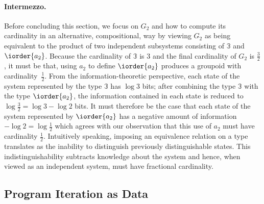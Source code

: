 \paragraph{Intermezzo.} Before concluding this section, we focus on
$G_2$ and how to compute its cardinality in an alternative,
compositional, way by viewing $G_2$ as being equivalent to the product
of two independent subsystems consisting of $\mathbb{3}$ and
$\iorder{a_2}$. Because the cardinality of $\mathbb{3}$ is 3 and the
final cardinality of $G_2$ is $\frac{3}{2}$, it must be that, using
$a_2$ to define $\iorder{a_2}$ produces a groupoid with
cardinality~$\frac{1}{2}$. From the information-theoretic perspective,
each state of the system represented by the type $\mathbb{3}$ has
$\log 3$ bits; after combining the type $\mathbb{3}$ with the type
$\iorder{a_2}$, the information contained in each state is reduced to
$\log \frac{3}{2} = \log 3 - \log 2$ bits. It must therefore be the case
that each state of the system represented by $\iorder{a_2}$ has a
negative amount of information $- \log 2 = \log \frac{1}{2}$ which
agrees with our observation that this use of $a_2$ must have cardinality
$\frac{1}{2}$. Intuitively speaking, imposing an equivalence relation on
a type translates as the inability to distinguish previously
distinguishable states. This indistinguishability subtracts knowledge
about the system and hence, when viewed as an independent system, must
have fractional cardinality.

\subsection{Program Iteration as Data}

